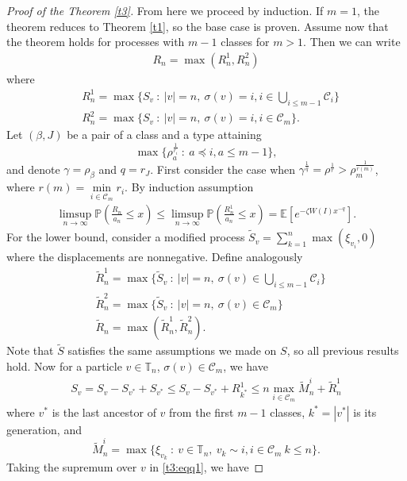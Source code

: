 \documentclass[12pt]{article}
\numberwithin{equation}{section}
\newcommand{\E}{\mathbb{E}}
\begin{document}
\begin{proof}[Proof of the Theorem \ref{t3}]
From here we proceed by induction. If $m=1$, the theorem reduces to Theorem \ref{t1}, so the base case is proven. Assume now that the theorem holds for processes with $m-1$ classes for $m>1$. Then we can write
\begin{align}
    R_n = \max(R^1_n,R^2_n)
\end{align}where 
\begin{align*}
&R^1_n = \max \{S_v \ : \ |v|=n, \ \sigma(v) =i, i \in \bigcup_{i\leq m-1} \mathcal{C}_i\}\\
&R^2_n = \max \{S_v \ : \ |v| = n,\ \sigma(v) =i, i \in  \mathcal{C}_m\}.
\end{align*}
Let $(\beta,J)$ be a pair of a class and a type attaining
\[\max{\{\rho_a^{\frac 1 {r_i}} \ : \ a \preceq i , a \leq m-1\}},\]
and denote $\gamma = \rho_\beta$ and $q = r_J$.
First consider the case when $\gamma^{\frac 1 q} = \rho^{\frac 1 r} > \rho_m^{\frac 1 {r(m)}}$, where $r(m) = \min\limits_{i \in \mathcal{C}_m} r_i$. By induction assumption
\begin{align}\label{t3:upper1}
\limsup_{n \rightarrow \infty}\mathbb{P}\left(\frac {R_n} {a_n} \leq x\right)  \leq \limsup_{n \rightarrow \infty} \mathbb{P}\left(\frac {R^1_n} {a_n} \leq x\right) = \E[e^{-\zeta W(I)x^{-q}}].
\end{align}
For the lower bound, consider a modified process $\tilde{S}_v = \sum_{k=1}^n \max \left( \xi_{v_i}, 0  \right)$ where the displacements are nonnegative. Define analogously
\begin{align*}
&\tilde{R}^1_n = \max \{\tilde{S}_v \ : \ |v|=n, \ \sigma(v) \in \bigcup_{i\leq m-1} \mathcal{C}_i\}\\
&\tilde{R}^2_n = \max \{\tilde{S}_v \ : \ |v| = n,\ \sigma(v) \in  \mathcal{C}_m\} \\
&\tilde{R}_n = \max(\tilde{R}^1_n,\tilde{R}^2_n).
\end{align*}
Note that $\tilde{S}$ satisfies the same assumptions we made on $S$, so all previous results hold. Now for a particle $v \in \mathbb{T}_n$, $\sigma(v) \in \mathcal{C}_m$, we have 
\begin{align}\label{t3:eqq1}
S_v = S_v - S_{v^*} + S_{v^*} \leq S_v - S_{v^*} + R^1_{k^*} \leq n\max_{i \in \mathcal{C}_m}\tilde{M}^i_n + \tilde{R}^1_n
\end{align}
where $v^*$ is the last ancestor of $v$ from the first $m-1$ classes, $k^* = |v^*|$ is its generation, and 
\[
\tilde{M}^i_n = \max\{\xi_{v_k} \ : \ v \in \mathbb{T}_n, \ v_k \sim i, i \in \mathcal{C}_m \ k\leq n\}.
\] 
Taking the supremum over $v$ in \eqref{t3:eqq1}, we have

\end{proof}
\end{document}
